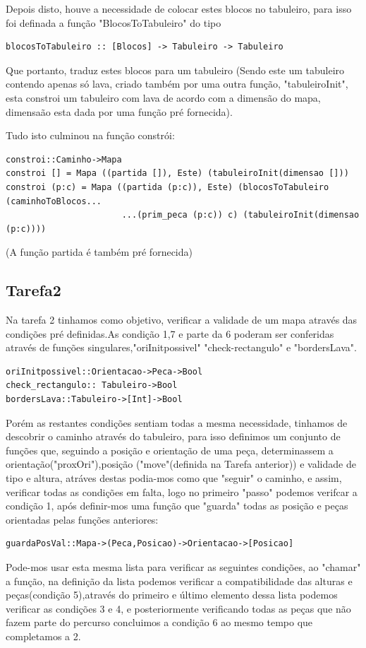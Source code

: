 \documentclass[a4paper]{report} %
\begin{document}
Depois disto, houve a necessidade de colocar estes blocos no tabuleiro, para isso foi definada a função "BlocosToTabuleiro" do tipo
\begin{verbatim}
blocosToTabuleiro :: [Blocos] -> Tabuleiro -> Tabuleiro
\end{verbatim}
Que portanto, traduz estes blocos para um tabuleiro (Sendo este um tabuleiro contendo apenas só lava, criado também por uma outra função, "tabuleiroInit", esta constroi um tabuleiro com lava de acordo com a dimensão do mapa, dimensaão esta dada por uma função pré fornecida).

Tudo isto culminou na função constrói:
\begin{verbatim}
constroi::Caminho->Mapa
constroi [] = Mapa ((partida []), Este) (tabuleiroInit(dimensao []))
constroi (p:c) = Mapa ((partida (p:c)), Este) (blocosToTabuleiro (caminhoToBlocos...
                       ...(prim_peca (p:c)) c) (tabuleiroInit(dimensao (p:c))))
\end{verbatim}
(A função partida é também pré fornecida)

\newpage

\subsection{Tarefa2}
Na tarefa 2 tinhamos como objetivo, verificar a validade de um mapa através das condições pré definidas.As condição 1,7 e parte da 6 poderam ser conferidas através de funções singulares,"oriInitpossivel" "check-rectangulo" e "bordersLava". 
\begin{verbatim}
oriInitpossivel::Orientacao->Peca->Bool
check_rectangulo:: Tabuleiro->Bool
bordersLava::Tabuleiro->[Int]->Bool
\end{verbatim}
Porém as restantes condições sentiam todas a mesma necessidade, tinhamos de descobrir o caminho através do tabuleiro, para isso definimos um conjunto de funções que, seguindo a posição e orientação de uma peça, determinassem a orientação("proxOri"),posição ("move"(definida na Tarefa anterior)) e validade de tipo e altura, atráves destas podia-mos como que "seguir" o caminho, e assim, verificar todas as condições em falta, logo no primeiro "passo" podemos verifcar a condição 1, após definir-mos uma função que "guarda" todas as posição e peças orientadas pelas funções anteriores:
\begin{verbatim}
guardaPosVal::Mapa->(Peca,Posicao)->Orientacao->[Posicao]
\end{verbatim}
Pode-mos usar esta mesma lista para verificar as seguintes condições, ao "chamar" a função, na definição da lista   podemos verificar a compatibilidade das alturas e peças(condição 5),através do primeiro e último elemento dessa lista podemos verificar as condições 3 e 4, e posteriormente verificando todas as peças que não fazem parte do percurso concluimos a condição 6 ao mesmo tempo que completamos a 2.
\end{document}
